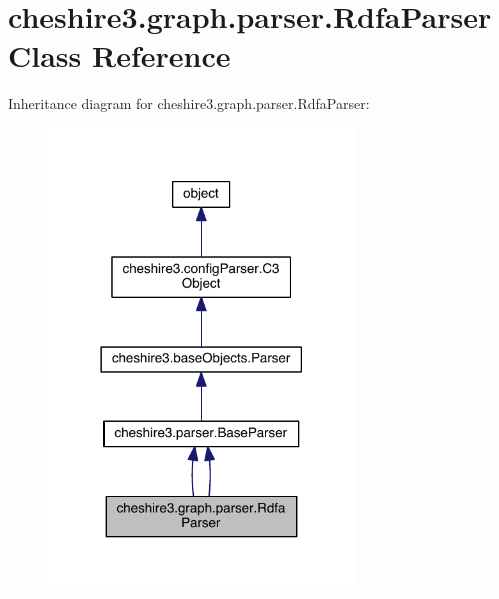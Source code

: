 \hypertarget{classcheshire3_1_1graph_1_1parser_1_1_rdfa_parser}{\section{cheshire3.\-graph.\-parser.\-Rdfa\-Parser Class Reference}
\label{classcheshire3_1_1graph_1_1parser_1_1_rdfa_parser}
}


Inheritance diagram for cheshire3.\-graph.\-parser.\-Rdfa\-Parser\-:
\nopagebreak
\begin{figure}[H]
\begin{center}
\leavevmode
\includegraphics[width=230pt]{classcheshire3_1_1graph_1_1parser_1_1_rdfa_parser__inherit__graph}
\end{center}
\end{figure}


